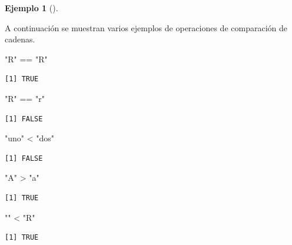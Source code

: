 \documentclass[
  a4paper,
]{scrreport}
\newenvironment{Shaded}{\begin{snugshade}}{\end{snugshade}}
\newcommand{\SpecialCharTok}[1]{\textcolor[rgb]{0.37,0.37,0.37}{#1}}
\newcommand{\StringTok}[1]{\textcolor[rgb]{0.13,0.47,0.30}{#1}}
\theoremstyle{definition}
\theoremstyle{definition}
\newtheorem{example}{Ejemplo}[chapter]
\theoremstyle{remark}
\begin{document}
\leavevmode{}%
\begin{example}[]\label{exm-operaciones-comparacion-cadenas}

A continuación se muestran varios ejemplos de operaciones de comparación
de cadenas.

\begin{Shaded}
\begin{Highlighting}[]
\StringTok{"R"} \SpecialCharTok{==} \StringTok{"R"}
\end{Highlighting}
\end{Shaded}

\begin{verbatim}
[1] TRUE
\end{verbatim}

\begin{Shaded}
\begin{Highlighting}[]
\StringTok{"R"} \SpecialCharTok{==} \StringTok{"r"}
\end{Highlighting}
\end{Shaded}

\begin{verbatim}
[1] FALSE
\end{verbatim}

\begin{Shaded}
\begin{Highlighting}[]
\StringTok{"uno"} \SpecialCharTok{\textless{}} \StringTok{"dos"}
\end{Highlighting}
\end{Shaded}

\begin{verbatim}
[1] FALSE
\end{verbatim}

\begin{Shaded}
\begin{Highlighting}[]
\StringTok{"A"} \SpecialCharTok{\textgreater{}} \StringTok{"a"}
\end{Highlighting}
\end{Shaded}

\begin{verbatim}
[1] TRUE
\end{verbatim}

\begin{Shaded}
\begin{Highlighting}[]
\StringTok{""} \SpecialCharTok{\textless{}} \StringTok{"R"}
\end{Highlighting}
\end{Shaded}

\begin{verbatim}
[1] TRUE
\end{verbatim}

\end{example}
\end{document}
